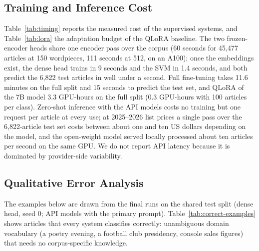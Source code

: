 \documentclass[preprint,12pt,authoryear]{elsarticle}
\newif\ifrevmarkup
\DeclareRobustCommand{\rev}[1]{\ifrevmarkup{\color{blue}#1}\else#1\fi}
\newcommand{\revblock}{\ifrevmarkup\color{blue}\fi}
\begin{document}
\subsection{Training and Inference Cost}
\label{sec:efficiency}

Table~\ref{tab:timing} reports the measured cost of the supervised systems, and Table~\ref{tab:lora} the adaptation budget of the QLoRA baseline. The two frozen-encoder heads share one encoder pass over the corpus (60 seconds for 45,477 articles at 150 wordpieces, 111 seconds at 512, on an A100); once the embeddings exist, the dense head trains in 9 seconds and the SVM in 1.4 seconds, and both predict the 6,822 test articles in well under a second. \rev{Full fine-tuning takes 11.6 minutes on the full split and 15 seconds to predict the test set, and QLoRA of the 7B model 3.3 GPU-hours on the full split (0.3 GPU-hours with 100 articles per class).} Zero-shot inference with the API models costs no training but one request per article at every use; at 2025--2026 list prices a single pass over the 6,822-article test set costs between about one and ten US dollars depending on the model, and the open-weight model served locally processed about ten articles per second on the same GPU. We do not report API latency because it is dominated by provider-side variability.


{\revblock}

\subsection{Qualitative Error Analysis}
\label{sec:qualitative}

\rev{The examples below are drawn from the final runs on the shared test split (dense head, seed 0; API models with the primary prompt).} Table~\ref{tab:correct-examples} shows articles that every system classifies correctly: unambiguous domain vocabulary (a poetry evening, a football club presidency, console sales figures) that needs no corpus-specific knowledge.
\end{document}

